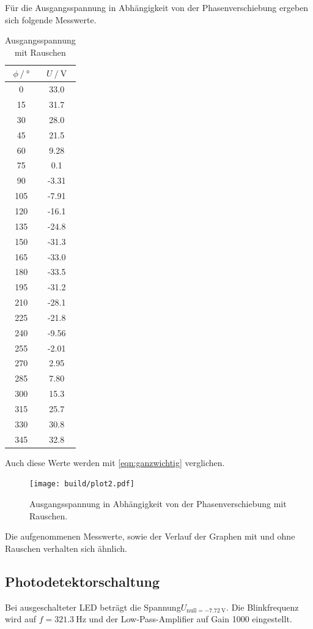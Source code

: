 Für die Ausgangsspannung in Abhängigkeit von der Phasenverschiebung ergeben sich folgende Messwerte.
\begin{table}
  \centering
  \caption{Ausgangsspannung mit Rauschen}
  \label{tab:ohne_Rauschen}
  \begin{tabular}{cc}
    \toprule {$\phi \:/\: °$} & {$U \:/\: \si{\volt}$} \\
    \midrule
    0	& 33.0 \\
    15 & 31.7 \\
    30 & 28.0 \\
    45	& 21.5 \\
    60 & 9.28 \\
    75 & 0.1 \\
    90	& -3.31 \\
    105 & -7.91 \\
    120	& -16.1 \\
    135	& -24.8 \\
    150	& -31.3 \\
    165 & -33.0 \\
    180	& -33.5 \\
    195	& -31.2 \\
    210	& -28.1 \\
    225	& -21.8 \\
    240 & -9.56 \\
    255	& -2.01 \\
    270	& 2.95 \\
    285	& 7.80 \\
    300	& 15.3 \\
    315	& 25.7 \\
    330	& 30.8 \\
    345	& 32.8 \\
    \bottomrule
    \end{tabular}
\end{table}

Auch diese Werte werden mit \ref{eqn:ganzwichtig} verglichen.
\begin{figure}
  \centering
  \texttt{[image: build/plot2.pdf]}
\caption{Ausgangsspannung in Abhängigkeit von der Phasenverschiebung mit Rauschen.}
  \label{fig:mit_rauschen}
\end{figure}

Die aufgenommenen Messwerte, sowie der Verlauf der Graphen mit und ohne Rauschen verhalten sich ähnlich.

\subsection{Photodetektorschaltung}
Bei ausgeschalteter LED beträgt die Spannung$U_{\mathrm{null} = \SI {-7,72}{\volt}}$.
Die Blinkfrequenz wird auf $f = \SI {321,3}{\Hz}$ und der Low-Pass-Amplifier auf Gain 1000 eingestellt.

